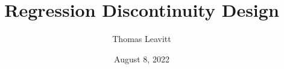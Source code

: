 \documentclass[table, xcolor = {dvipsnames}, 9pt]{beamer}
\title[]{Regression Discontinuity Design} %
\author{Thomas Leavitt} %
\institute[] %
{
\medskip
\textit{} %
}
\date{August 8, 2022} %
\theoremstyle{plain}
\begin{document}
\begin{frame}
\titlepage %
\end{frame}


\end{document}

